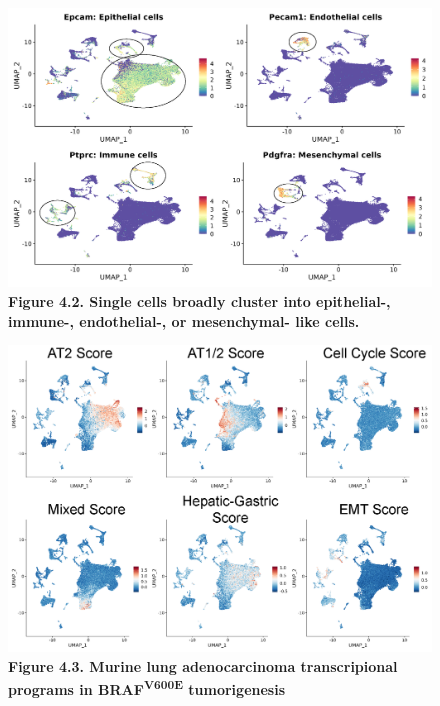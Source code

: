 \begin{figure}
\hypertarget{fig:04}{%
\centering
\includegraphics[width=1\textwidth,height=\textheight]{images/scrna_2.png}
\caption{\textbf{Figure 4.2. Single cells broadly cluster into epithelial-, immune-, endothelial-, or mesenchymal- like cells.}}\label{fig:04}
}
\end{figure}

\begin{figure}
\hypertarget{fig:04}{%
\centering
\includegraphics[width=1\textwidth,height=\textheight]{images/scrna_3.png}
\caption{\textbf{Figure 4.3. Murine lung adenocarcinoma transcripional programs in BRAF\textsuperscript{V600E} tumorigenesis}}\label{fig:04}
}
\end{figure}

